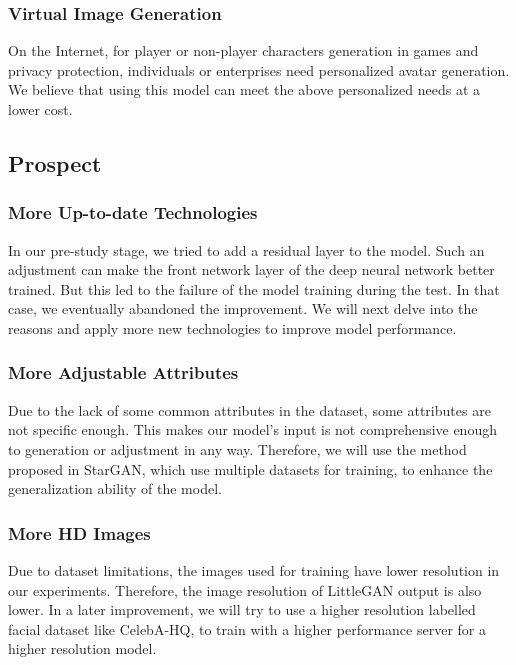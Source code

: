 \subsubsection*{Virtual Image Generation}
On the Internet, for player or non-player characters generation in games and privacy protection,
    individuals or enterprises need personalized avatar generation.
We believe that using this model can meet the above personalized needs at a lower cost.

\subsection{Prospect}

\subsubsection*{More Up-to-date Technologies}

In our pre-study stage, we tried to add a residual layer to the model.
Such an adjustment can make the front network layer of the deep neural network better trained.
But this led to the failure of the model training during the test.
In that case, we eventually abandoned the improvement.
We will next delve into the reasons and apply more new technologies to improve model performance.


\subsubsection*{More Adjustable Attributes}

Due to the lack of some common attributes in the dataset,
    some attributes are not specific enough.
This makes our model's input is not comprehensive enough to generation or adjustment in any way.
Therefore, we will use the method proposed in StarGAN,
    which use multiple datasets for training, to enhance the generalization ability of the model.


\subsubsection*{More HD Images}

Due to dataset limitations, the images used for training have lower resolution in our experiments.
Therefore, the image resolution of LittleGAN output is also lower.
In a later improvement, we will try to use a higher resolution labelled facial dataset like CelebA-HQ,
    to train with a higher performance server for a higher resolution model.


